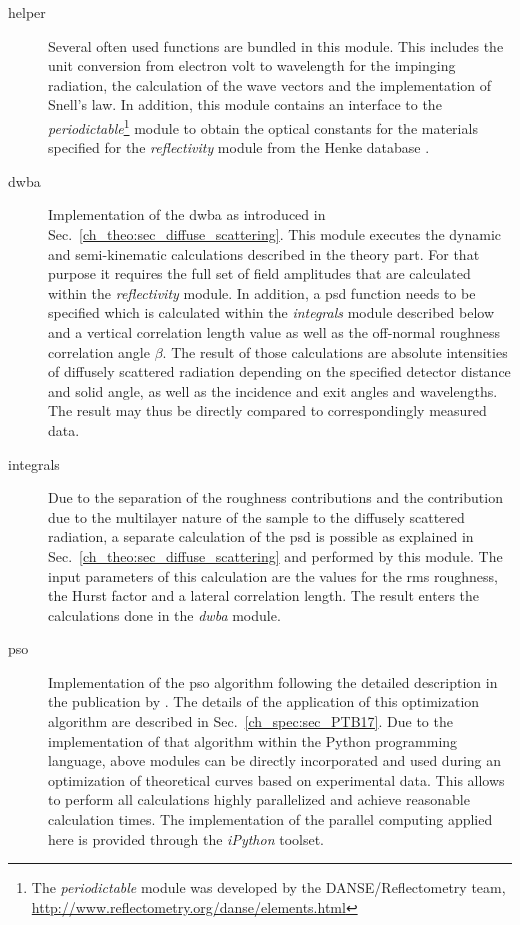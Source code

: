 \begin{description}
 \item[helper]{Several often used functions are bundled in this module. This includes the unit conversion from electron volt to wavelength for the impinging radiation, the calculation of the wave vectors and the implementation of Snell's law. In addition, this module contains an interface to the \emph{periodictable}\footnote{The \emph{periodictable} module was developed by the DANSE/Reflectometry team, \url{http://www.reflectometry.org/danse/elements.html}} module to obtain the optical constants for the materials specified for the \emph{reflectivity} module from the Henke database \cite{henke_x-ray_1993}.}
 
 \item[dwba]{Implementation of the \gls{dwba} as introduced in Sec.~\ref{ch_theo:sec_diffuse_scattering}. This module executes the dynamic and semi-kinematic calculations described in the theory part. For that purpose it requires the full set of field amplitudes that are calculated within the \emph{reflectivity} module. In addition, a \gls{psd} function needs to be specified which is calculated within the \emph{integrals} module described below and a vertical correlation length value as well as the off-normal roughness correlation angle $\beta$. The result of those calculations are absolute intensities of diffusely scattered radiation depending on the specified detector distance and solid angle, as well as the incidence and exit angles and wavelengths. The result may thus be directly compared to correspondingly measured data.}
 
 \item[integrals]{Due to the separation of the roughness contributions and the contribution due to the multilayer nature of the sample to the diffusely scattered radiation, a separate calculation of the \gls{psd} is possible as explained in Sec.~\ref{ch_theo:sec_diffuse_scattering} and performed by this module. The input parameters of this calculation are the values for the \gls{rms} roughness, the Hurst factor and a lateral correlation length. The result enters the calculations done in the \emph{dwba} module.}
 
 \item[pso]{Implementation of the \gls{pso} algorithm following the detailed description in the publication by \textcite{carlisle_off--shelf_2001}. The details of the application of this optimization algorithm are described in Sec.~\ref{ch_spec:sec_PTB17}. Due to the implementation of that algorithm within the Python programming language, above modules can be directly incorporated and used during an optimization of theoretical curves based on experimental data. This allows to perform all calculations highly parallelized and achieve reasonable calculation times. The implementation of the parallel computing applied here is provided through the \emph{iPython} toolset.}
 

\end{description}
